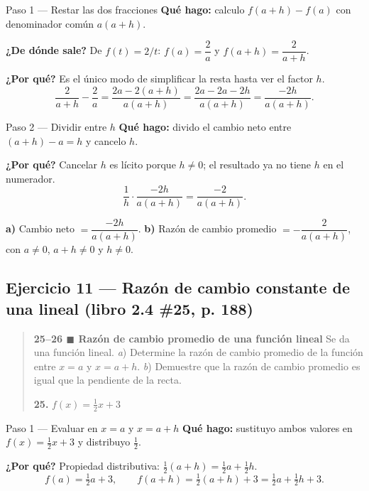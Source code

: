 \documentclass[11pt]{article}
\begin{document}
\begin{paso}{Paso 1 --- Restar las dos fracciones}
\textbf{Qué hago:} calculo $f(a+h)-f(a)$ con denominador común $a(a+h)$.

\textbf{¿De dónde sale?} De $f(t)=2/t$: $f(a)=\dfrac{2}{a}$ y $f(a+h)=\dfrac{2}{a+h}$.

\textbf{¿Por qué?} Es el único modo de simplificar la resta hasta ver el factor $h$.
\[
\frac{2}{a+h}-\frac{2}{a}=\frac{2a-2(a+h)}{a(a+h)}=\frac{2a-2a-2h}{a(a+h)}=\frac{-2h}{a(a+h)}.
\]
\end{paso}

\begin{paso}{Paso 2 --- Dividir entre $h$}
\textbf{Qué hago:} divido el cambio neto entre $(a+h)-a=h$ y cancelo $h$.

\textbf{¿Por qué?} Cancelar $h$ es lícito porque $h\neq 0$; el resultado ya no tiene $h$ en el numerador.
\[
\frac{1}{h}\cdot\frac{-2h}{a(a+h)}=\frac{-2}{a(a+h)}.
\]
\end{paso}

\begin{resp}
\textbf{a)} Cambio neto $=\dfrac{-2h}{a(a+h)}$. \qquad \textbf{b)} Razón de cambio promedio $=-\dfrac{2}{a(a+h)}$, con $a\neq 0$, $a+h\neq 0$ y $h\neq 0$.
\end{resp}

\subsection*{Ejercicio 11 — Razón de cambio constante de una lineal (libro 2.4 \#25, p. 188)}

\begin{quote}
\textbf{25--26 $\blacksquare$ Razón de cambio promedio de una función lineal} \; Se da una función lineal. \emph{a}) Determine la razón de cambio promedio de la función entre $x=a$ y $x=a+h$. \emph{b}) Demuestre que la razón de cambio promedio es igual que la pendiente de la recta.

\textbf{25.} $f(x)=\tfrac{1}{2}x+3$
\end{quote}

\begin{paso}{Paso 1 --- Evaluar en $x=a$ y $x=a+h$}
\textbf{Qué hago:} sustituyo ambos valores en $f(x)=\tfrac12 x+3$ y distribuyo $\tfrac12$.

\textbf{¿Por qué?} Propiedad distributiva: $\tfrac12(a+h)=\tfrac12 a+\tfrac12 h$.
\[
f(a)=\tfrac12 a+3,\qquad f(a+h)=\tfrac12(a+h)+3=\tfrac12 a+\tfrac12 h+3.
\]
\end{paso}
\end{document}
